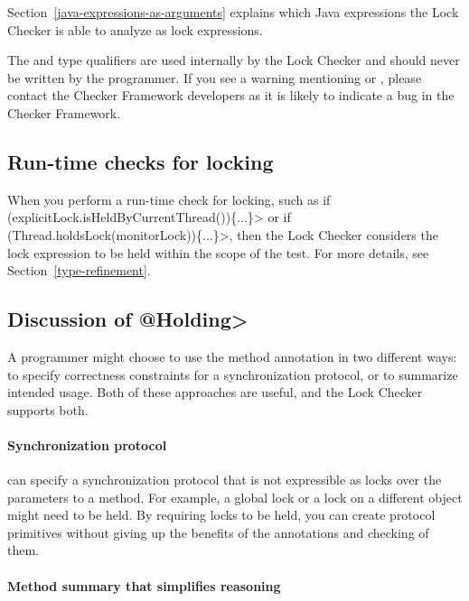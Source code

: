Section~\ref{java-expressions-as-arguments} explains which Java
expressions the Lock Checker is able to analyze as lock expressions.


The  and  type qualifiers are used internally by the Lock Checker
and should never be written by the programmer.
If you
see a warning mentioning  or ,
please contact the Checker Framework developers as it is likely to
indicate a bug in the Checker Framework.


\subsection{Run-time checks for locking\label{lock-runtime-checks}}

When you perform a run-time check for locking, such as
\<if (explicitLock.isHeldByCurrentThread())\{...\}> or
\<if (Thread.holdsLock(monitorLock))\{...\}>,
then the Lock Checker considers the lock expression to be held
within the scope of the test.  For more details, see
Section~\ref{type-refinement}.


\subsection{Discussion of \<@Holding>\label{lock-checker-holding}}

A programmer might choose to use the  method annotation in
two different ways:  to specify correctness constraints for a synchronization protocol, or to summarize
intended usage.  Both of these approaches are useful, and the Lock Checker
supports both.

\paragraph{Synchronization protocol\label{lock-checker-holding-synchronization-protocol}}

   can specify a synchronization protocol that
  is not expressible as locks over the parameters to a method.  For example, a global lock
  or a lock on a different object might need to be held.  By requiring locks to be
  held, you can create protocol primitives without giving up
  the benefits of the annotations and checking of them.

\paragraph{Method summary that simplifies reasoning\label{lock-checker-holding-method-summary}}

